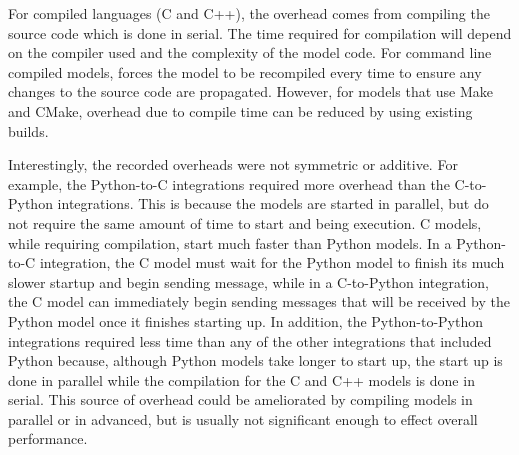 \documentclass[journal]{IEEEtran}
\newcommand{\todo}[1]{{\color{red}{#1}}}
\newcommand{\pkg}{{\tt \todo{cis\_interface}}{}}
\begin{document}
For compiled languages (C and C++), the overhead comes from compiling the source code which is done in serial. The time required for compilation will depend on the compiler used and the complexity of the model code. For command line compiled models, {\pkg} forces the model to be recompiled every time to ensure any changes to the source code are propagated. However, for models that use Make and CMake, overhead due to compile time can be reduced by using existing builds.

Interestingly, the recorded overheads were not symmetric or additive. For example, the Python-to-C integrations required more overhead than the C-to-Python integrations. This is because the models are started in parallel, but do not require the same amount of time to start and being execution. C models, while requiring compilation, start much faster than Python models. In a Python-to-C integration, the C model must wait for the Python model to finish its much slower startup and begin sending message, while in a C-to-Python integration, the C model can immediately begin sending messages that will be received by the Python model once it finishes starting up. In addition, the Python-to-Python integrations required less time than any of the other integrations that included Python because, although Python models take longer to start up, the start up is done in parallel while the compilation for the C and C++ models is done in serial. This source of overhead could be ameliorated by compiling models in parallel or in advanced, but is usually not significant enough to effect overall performance.


\end{document}
